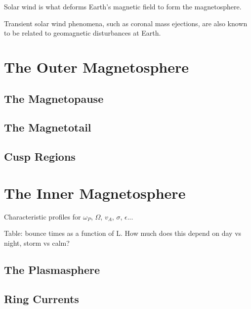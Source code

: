 Solar wind is what deforms Earth's magnetic field to form the magnetosphere. 

Transient solar wind phenomena, such as coronal mass ejections, are also known to be related to geomagnetic disturbances at Earth. 





\section{The Outer Magnetosphere}

\subsection{The Magnetopause}

\subsection{The Magnetotail}

\subsection{Cusp Regions}

\section{The Inner Magnetosphere}

Characteristic profiles for $\omega_P$, $\Omega$, $v_A$, $\sigma$, $\epsilon$...

Table: bounce times as a function of L. How much does this depend on day vs night, storm vs calm? 

\subsection{The Plasmasphere}

\subsection{Ring Currents}

